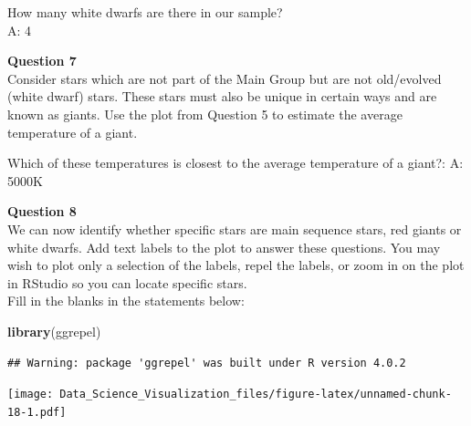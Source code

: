 \documentclass[
]{article}
\newenvironment{Shaded}{\begin{snugshade}}{\end{snugshade}}
\newcommand{\DataTypeTok}[1]{\textcolor[rgb]{0.13,0.29,0.53}{#1}}
\newcommand{\KeywordTok}[1]{\textcolor[rgb]{0.13,0.29,0.53}{\textbf{#1}}}
\newcommand{\NormalTok}[1]{#1}
\newcommand{\OperatorTok}[1]{\textcolor[rgb]{0.81,0.36,0.00}{\textbf{#1}}}
\newcommand{\StringTok}[1]{\textcolor[rgb]{0.31,0.60,0.02}{#1}}
\begin{document}
How many white dwarfs are there in our sample?\\
A: 4

\textbf{Question 7}\\
Consider stars which are not part of the Main Group but are not
old/evolved (white dwarf) stars. These stars must also be unique in
certain ways and are known as giants. Use the plot from Question 5 to
estimate the average temperature of a giant.

Which of these temperatures is closest to the average temperature of a
giant?: A: 5000K

\textbf{Question 8}\\
We can now identify whether specific stars are main sequence stars, red
giants or white dwarfs. Add text labels to the plot to answer these
questions. You may wish to plot only a selection of the labels, repel
the labels, or zoom in on the plot in RStudio so you can locate specific
stars.\\
Fill in the blanks in the statements below:

\begin{Shaded}
\begin{Highlighting}[]
\KeywordTok{library}\NormalTok{(ggrepel)}
\end{Highlighting}
\end{Shaded}

\begin{verbatim}
## Warning: package 'ggrepel' was built under R version 4.0.2
\end{verbatim}

\begin{Shaded}
\end{Shaded}

\texttt{[image: Data\_Science\_Visualization\_files/figure-latex/unnamed-chunk-18-1.pdf]}
\end{document}
